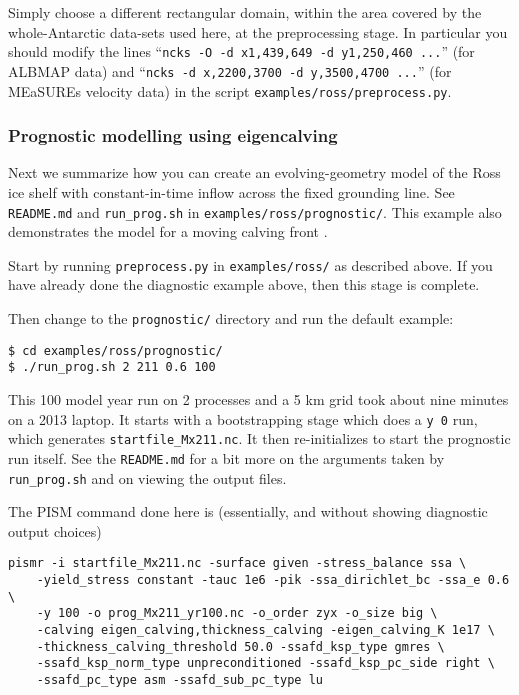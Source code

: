 Simply choose a different rectangular domain, within the area covered by the whole-Antarctic data-sets used here, at the preprocessing stage.  In particular you should modify the lines ``\texttt{ncks -O -d x1,439,649 -d y1,250,460 ...}'' (for ALBMAP data) and ``\texttt{ncks -d x,2200,3700 -d y,3500,4700 ...}'' (for MEaSUREs velocity data) in the script \texttt{examples/ross/preprocess.py}.

\subsubsection*{Prognostic modelling using eigencalving}  Next we summarize how you can create an evolving-geometry model of the Ross ice shelf with constant-in-time inflow across the fixed grounding line.  See \texttt{README.md} and \texttt{run_prog.sh} in \texttt{examples/ross/prognostic/}.  This example also demonstrates the  model for a moving calving front \cite{Levermannetal2012}.

Start by running \texttt{preprocess.py} in \texttt{examples/ross/} as described above.  If you have already done the diagnostic example above, then this stage is complete.

Then change to the \texttt{prognostic/} directory and run the default example:

\begin{verbatim}
$ cd examples/ross/prognostic/
$ ./run_prog.sh 2 211 0.6 100
\end{verbatim}%

\noindent This 100 model year run on 2 processes and a 5 km grid took about nine minutes on a 2013 laptop.  It starts with a bootstrapping stage which does a \texttt{y 0} run, which generates \texttt{startfile_Mx211.nc}.  It then re-initializes to start the prognostic run itself.  See the \texttt{README.md} for a bit more on the arguments taken by \texttt{run_prog.sh} and on viewing the output files.

The PISM command done here is (essentially, and without showing diagnostic output choices)

\begin{verbatim}
pismr -i startfile_Mx211.nc -surface given -stress_balance ssa \
    -yield_stress constant -tauc 1e6 -pik -ssa_dirichlet_bc -ssa_e 0.6 \
    -y 100 -o prog_Mx211_yr100.nc -o_order zyx -o_size big \
    -calving eigen_calving,thickness_calving -eigen_calving_K 1e17 \
    -thickness_calving_threshold 50.0 -ssafd_ksp_type gmres \
    -ssafd_ksp_norm_type unpreconditioned -ssafd_ksp_pc_side right \
    -ssafd_pc_type asm -ssafd_sub_pc_type lu
\end{verbatim}%

